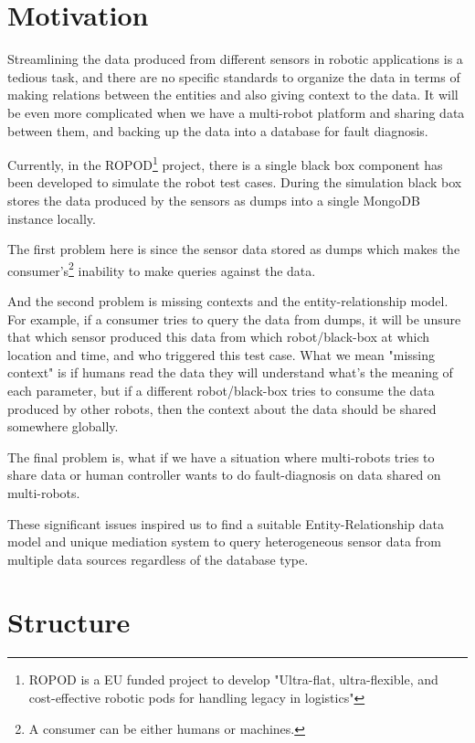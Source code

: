     \section{Motivation}
    
Streamlining the data produced from different sensors in robotic applications is a tedious task, and there are no specific standards to organize the data in terms of making relations between the entities and also giving context to the data. It will be even more complicated when we have a multi-robot platform and sharing data between them, and backing up the data into a database for fault diagnosis.

Currently, in the ROPOD\footnote{ROPOD is a EU funded project to develop "Ultra-flat, ultra-flexible, and cost-effective robotic pods for handling legacy in logistics"} project, there is a single black box component has been developed to simulate the robot test cases. During the simulation black box stores the data produced by the sensors as dumps into a single MongoDB instance locally.  

The first problem here is since the sensor data stored as dumps which makes the consumer's\footnote{A consumer can be either humans or machines.} inability to make queries against the data. 

And the second problem is missing contexts and the entity-relationship model. For example, if a consumer tries to query the data from dumps, it will be unsure that which sensor produced this data from which robot/black-box at which location and time, and who triggered this test case. What we mean "missing context" is if humans read the data they will understand what's the meaning of each parameter, but if a different robot/black-box tries to consume the data produced by other robots, then the context about the data should be shared somewhere globally.

The final problem is, what if we have a situation where multi-robots tries to share data or human controller wants to do fault-diagnosis on data shared on multi-robots. 


These significant issues inspired us to find a suitable Entity-Relationship data model and unique mediation system to query heterogeneous sensor data from multiple data sources regardless of the database type.


    \section{Structure}
	
